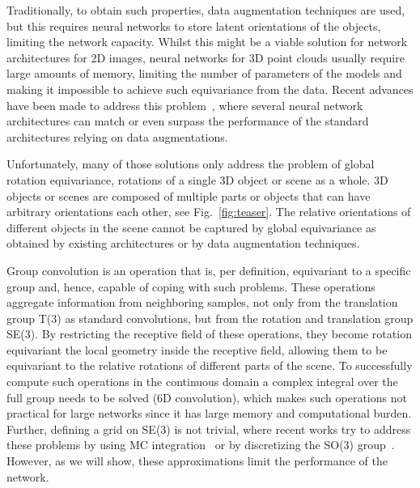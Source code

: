 Traditionally, to obtain such properties, data augmentation techniques are used, but this requires neural networks to store latent orientations of the objects, limiting the network capacity.
Whilst this might be a viable solution for network architectures for 2D images, neural networks for 3D point clouds usually require large amounts of memory, limiting the number of parameters of the models and making it impossible to achieve such equivariance from the data.
Recent advances have been made to address this problem~\cite{deng2021vector, puny2022frame}, where several neural network architectures can match or even surpass the performance of the standard architectures relying on data augmentations.

Unfortunately, many of those solutions only address the problem of global rotation equivariance, \ie rotations of a single 3D object or scene as a whole.
3D objects or scenes are composed of multiple parts or objects that can have arbitrary orientations \wrt each other, see Fig.~\ref{fig:teaser}.
The relative orientations of different objects in the scene cannot be captured by global equivariance as obtained by existing architectures or by data augmentation techniques.



Group convolution is an operation that is, per definition, equivariant to a specific group and, hence, capable of coping with such problems.
These operations aggregate information from neighboring samples, not only from the translation group T(3) as standard convolutions, but from the rotation and translation group SE(3).
By restricting the receptive field of these operations, they become rotation equivariant \wrt the local geometry inside the receptive field, allowing them to be equivariant to the relative rotations of different parts of the scene.
To successfully compute such operations in the continuous domain a complex integral over the full group needs to be solved (6D convolution), which makes such operations not practical for large networks since it has large memory and computational burden. Further, defining a grid on SE(3) is not trivial, where recent works try to address these problems by using \ac{MC} integration~\cite{finzi2020generalizing} or by discretizing the SO(3) group~\cite{chen2021equivariant, zhu2023e2pn}.
However, as we will show, these approximations limit the performance of the network.

